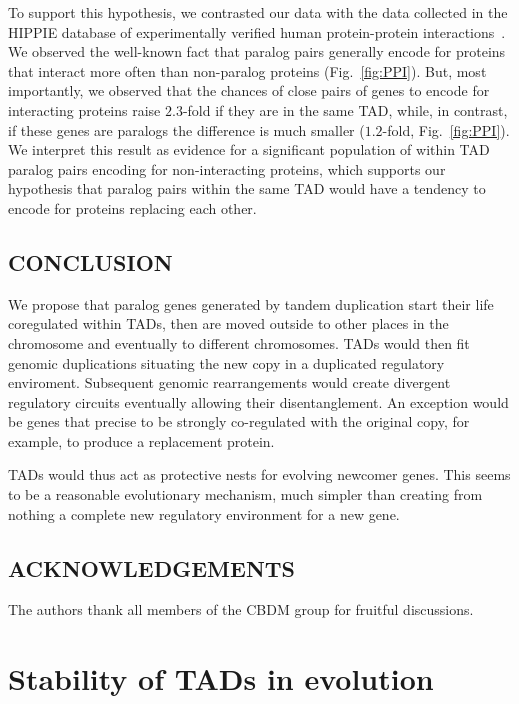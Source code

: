 \documentclass[a4paper,twoside=true,openright,parskip=full,chapterprefix=true,11pt,headings=normal,bibliography=totoc,listof=totoc,titlepage=on,captions=tableabove,draft=false]{scrreprt}
\theoremstyle{definition}
\theoremstyle{definition}
\theoremstyle{definition}
\theoremstyle{remark}
\begin{document}
To support this hypothesis, we contrasted our data with the data
collected in the HIPPIE database of experimentally verified human
protein-protein interactions~\citep{Schaefer2012}. We observed the
well-known fact that paralog pairs generally encode for proteins that
interact more often than non-paralog proteins (Fig.~\ref{fig:PPI}). But,
most importantly, we observed that the chances of close pairs of genes
to encode for interacting proteins raise \(2.3\)-fold if they are in the
same TAD, while, in contrast, if these genes are paralogs the difference
is much smaller (\(1.2\)-fold, Fig.~\ref{fig:PPI}). We interpret this
result as evidence for a significant population of within TAD paralog
pairs encoding for non-interacting proteins, which supports our
hypothesis that paralog pairs within the same TAD would have a tendency
to encode for proteins replacing each other.

\section{CONCLUSION}\label{conclusion}

We propose that paralog genes generated by tandem duplication start
their life coregulated within TADs, then are moved outside to other
places in the chromosome and eventually to different chromosomes. TADs
would then fit genomic duplications situating the new copy in a
duplicated regulatory enviroment. Subsequent genomic rearrangements
would create divergent regulatory circuits eventually allowing their
disentanglement. An exception would be genes that precise to be strongly
co-regulated with the original copy, for example, to produce a
replacement protein.

TADs would thus act as protective nests for evolving newcomer genes.
This seems to be a reasonable evolutionary mechanism, much simpler than
creating from nothing a complete new regulatory environment for a new
gene.

\section{ACKNOWLEDGEMENTS}\label{acknowledgements}

The authors thank all members of the CBDM group for fruitful
discussions.

\chapter{Stability of TADs in evolution}\label{TAD-evolution}
\end{document}
